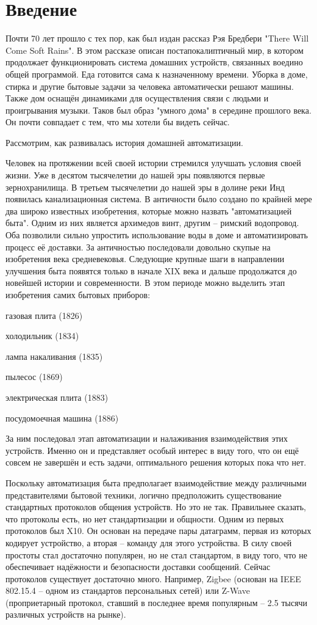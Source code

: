 \section{Введение}

Почти 70 лет прошло с тех пор, как был издан рассказ Рэя Бредбери "There Will Come Soft Rains".
В этом рассказе описан постапокалиптичный мир, в котором продолжает функционировать система домашних устройств, связанных воедино общей программой.
Еда готовится сама к назначенному времени. Уборка в доме, стирка и другие бытовые задачи за человека автоматически решают машины.
Также дом оснащён динамиками для осуществления связи с людьми и проигрывания музыки.
Таков был образ "умного дома" в середине прошлого века. Он почти совпадает с тем, что мы хотели бы видеть сейчас.

Рассмотрим, как развивалась история домашней автоматизации.

Человек на протяжении всей своей истории стремился улучшать условия своей жизни.
Уже в десятом тысячелетии до нашей эры появляются первые зернохранилища.
В третьем тысячелетии до нашей эры в долине реки Инд появилась канализационная система.
В античности было создано по крайней мере два широко известных изобретения, которые можно назвать "автоматизацией быта". Одним из них является архимедов винт, другим -- римский водопровод.
Оба позволили сильно упростить использование воды в доме и автоматизировать процесс её доставки.
За античностью последовали довольно скупые на изобретения века средневековья.
Следующие крупные шаги в направлении улучшения быта появятся только в начале XIX века и дальше продолжатся до новейшей истории и современности.
В этом периоде можно выделить этап изобретения самих бытовых приборов:
\begin{list}{}{}
\item газовая плита (1826)
\item холодильник (1834)
\item лампа накаливания (1835)
\item пылесос (1869)
\item электрическая плита (1883)
\item посудомоечная машина (1886)
\end{list}
За ним последовал этап автоматизации и налаживания взаимодействия этих устройств.
Именно он и представляет особый интерес в виду того, что он ещё совсем не завершён и есть задачи, оптимального решения которых пока что нет.

Поскольку автоматизация быта предполагает взаимодействие между различными представителями бытовой техники, логично предположить существование стандартных протоколов общения устройств.
Но это не так. Правильнее сказать, что протоколы есть, но нет стандартизации и общности.
Одним из первых протоколов был X10. Он основан на передаче пары датаграмм, первая из которых кодирует устройство, а вторая -- команду для этого устройства.
В силу своей простоты стал достаточно популярен, но не стал стандартом, в виду того, что не обеспечивает надёжности и безопасности доставки сообщений.
Сейчас протоколов существует достаточно много. Например, Zigbee (основан на IEEE 802.15.4 -- одном из стандартов персональных сетей) или Z-Wave (проприетарный протокол, ставший в последнее время популярным -- 2.5 тысячи различных устройств на рынке).
